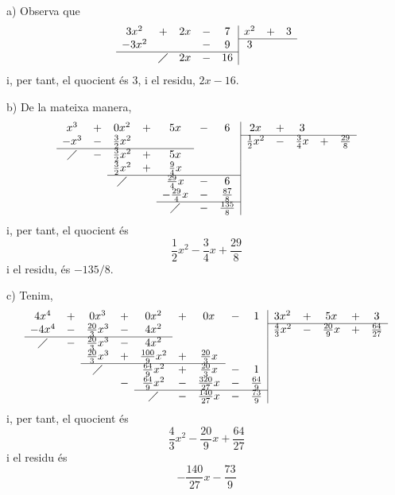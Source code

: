 \begin{solucio}
a) Observa que\[
\begin{array}{ccccc|ccc}
3x^{2} & + & 2x & - & 7 & x^{2} & + & 3 \\ \cline{6-8}
-3x^{2} & & & - & 9 & 3 & & \\ \cline{1-5}
& \diagup & 2x & - & 16 & & &
\end{array}\]i, per tant, el quocient és $3$, i el residu, $2x-16$.

b) De la mateixa manera,\[
\begin{array}{ccccccc|ccccc}
x^{3} & + & 0x^{2} & + & 5x & - & 6 & 2x & + & 3 & & \\ \cline{8-12}
-x^{3} & - & \frac{3}{2}x^{2} & & & & & \frac{1}{2}x^{2} & - & \frac{3}{4}x & + & \frac{29}{8} \\ \cline{1-5}
\diagup & - & \frac{3}{2}x^{2} & + & 5x & & & & & & & \\
& & \frac{3}{2}x^{2} & + & \frac{9}{4}x & & & & & & & \\ \cline{3-7}
& & \diagup & & \frac{29}{4}x & - & 6 & & & & & \\
& & & & -\frac{29}{4}x & - & \frac{87}{8} & & & & & \\ \cline{5-7}
& & & & \diagup & - & \frac{135}{8} & & & & &
\end{array}\]i, per tant, el quocient és\[
\frac{1}{2}x^{2}-\frac{3}{4}x+\frac{29}{8}
\]i el residu, és $-135/8$.

c) Tenim,\[
\begin{array}{ccccccccc|ccccc}
4x^{4} & + & 0x^{3} & + & 0x^{2} & + & 0x & - & 1 & 3x^{2} & + & 5x & + & 3
\\ \cline{10-14}
-4x^{4} & - & \frac{20}{3}x^{3} & - & 4x^{2} & & & & & \frac{4}{3}x^{2}
& - & \frac{20}{9}x & + & \frac{64}{27} \\ \cline{1-5}
\diagup & - & \frac{20}{3}x^{3} & - & 4x^{2} & & & & & & & & & \\
& & \frac{20}{3}x^{3} & + & \frac{100}{9}x^{2} & + & \frac{20}{3}x & & &
& & & & \\ \cline{3-7}
& & \diagup & & \frac{64}{9}x^{2} & + & \frac{20}{3}x & - & 1 & & & &
& \\
& & & - & \frac{64}{9}x^{2} & - & \frac{320}{27}x & - & \frac{64}{9} & &
& & & \\ \cline{5-9}
& & & & \diagup & - & \frac{140}{27}x & - & \frac{73}{9} & & & & &
\end{array}\]i, per tant, el quocient és\[
\frac{4}{3}x^{2}-\frac{20}{9}x+\frac{64}{27}
\]i el residu és
\[
-\frac{140}{27}x-\frac{73}{9}
\]


\end{solucio}
